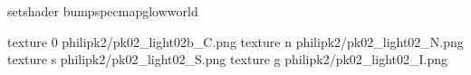 setshader bumpspecmapglowworld


texture 0 philipk2/pk02_light02b_C.png
texture n philipk2/pk02_light02_N.png
texture s philipk2/pk02_light02_S.png
texture g philipk2/pk02_light02_I.png

